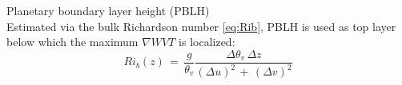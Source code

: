 \documentclass[landscape,a0paper,fontscale=0.45,margin=1cm]{baposter/baposter}
\begin{document}
\begin{poster}
{\colouredcircle Planetary boundary layer height (PBLH)\\
Estimated via the bulk Richardson number \ref{eq:Rib}, PBLH is used as top layer below which the maximum $\nabla WVT$ is localized:
\begin{equation}
	Ri_b(z)\,=\,\frac{g}{\theta_v}\frac{\Delta \theta_v \,\Delta z}{\left( \Delta u \right)^2\,+\,\left(\Delta v \right)^2}
	\label{eq:Rib}
\end{equation}


} %


\end{poster}
\end{document}
